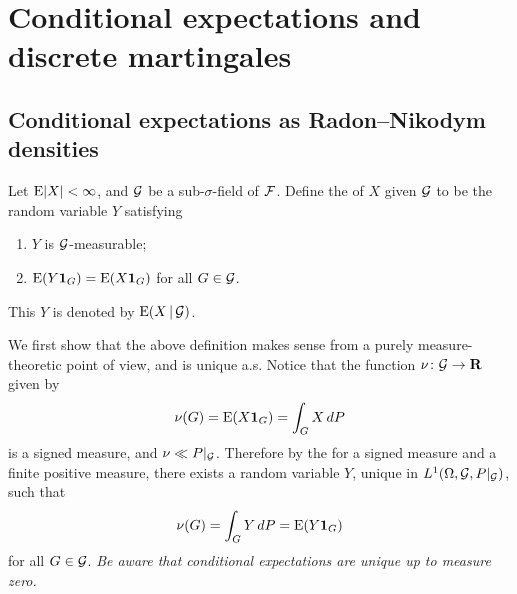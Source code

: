 \begin{namedthm}
    
\end{namedthm}

\begin{namedthm}
    
\end{namedthm}

\chapter{Conditional expectations and discrete martingales}
\section{Conditional expectations as Radon--Nikodym densities}
\begin{defn}
    Let $\mathop{}\!\mathrm{E} \lvert X \rvert < \infty$, and $\mathcal{G}$ be a sub-$\sigma$-field of $\mathcal{F}$. Define the  of $X$ given $\mathcal{G}$ to be the random variable $Y$ satisfying \begin{enumerate}
        \item $Y$ is $\mathcal{G}$-measurable; 
        \item \label{enu:equal-int-cond-expec} $\mathop{}\!\mathrm{E}(Y \mathbf{1}_{G}) = \mathop{}\!\mathrm{E}(X \mathbf{1}_G)$ for all $G \in \mathcal{G}$.
    \end{enumerate}
    This $Y$ is denoted by $\mathop{}\!\mathrm{E}(X \,|\, \mathcal{G})$.
\end{defn}

We first show that the above definition makes sense from a purely measure-theoretic point of view, and is unique a.s.
Notice that the function $\nu\colon \mathcal{G} \to \mathbf{R}$ given by \begin{equation} \label{eq:cond-expec-signed-meas}
    \nu(G) = \mathop{}\!\mathrm{E}(X\mathbf{1}_G) = \int_G X \,dP
\end{equation} is a signed measure, and $\nu \ll P|_{\mathcal{G}}$. Therefore by the  for a signed measure and a finite positive measure, there exists a random variable $Y$, unique in $L^1(\Omega,\mathcal{G},P|_{\mathcal{G}})$, such that \[
    \nu(G) = \int_G Y \,dP = \mathop{}\!\mathrm{E}(Y\mathbf{1}_G)
\] for all $G\in \mathcal{G}$. \emph{Be aware that conditional expectations are unique up to measure zero.}


